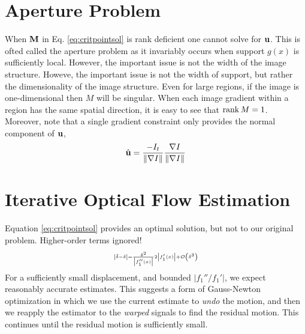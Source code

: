 \begin{compactdesc}
	\section{Aperture Problem}
	When $\bm{\mathrm{M}}$ in Eq. \ref{eq:critpointsol} is rank deficient one cannot solve for $\bm{\mathrm{u}}$. This is ofted called the aperture problem as it invariably occurs when support $g(x)$ is sufficiently local. However, the important issue is not the width of the image structure. Howeve, the important issue is not the width of support, but rather the dimensionality of the image structure. Even for large regions, if the image is one-dimensional then $M$ will be singular. When each image gradient within a region has the same spatial direction, it is easy to see that $\operatorname*{rank} M=1$. Moreover, note that a single gradient constraint only provides the normal component of $\bm{\mathrm{u}}$,
	\begin{gather*}
		\hat{\bm{\mathrm{u}}}=\frac{-I_t}{\left\lVert \nabla I \right\rVert}\frac{\nabla I}{\left\lVert \nabla I \right\rVert}
	\end{gather*}
\section{Iterative Optical Flow Estimation}
Equation \ref{eq:critpointsol} provides an optimal solution, but not to our original problem. Higher-order terms ignored!
\begin{gather*}\scriptscriptstyle
	\left\lvert \tilde{\delta}-\delta \right\rvert =\frac{\delta^2}{\left\lvert f_1''(x) \right\rvert}{2\left\lvert f_1'(x) \right\rvert}+\mathcal{O}\left( \delta^3 \right)
\end{gather*}
For a sufficiently small displacement, and bounded $\lvert f_1''/f_1'\rvert $, we expect reasonably accurate estimates. This suggests a form of Gauss-Newton optimization in which we use the current estimate to \emph{undo} the motion, and then we reapply the estimator to the \emph{warped} signals to find the residual motion. This continues until the residual motion is sufficiently small.


\end{compactdesc}
